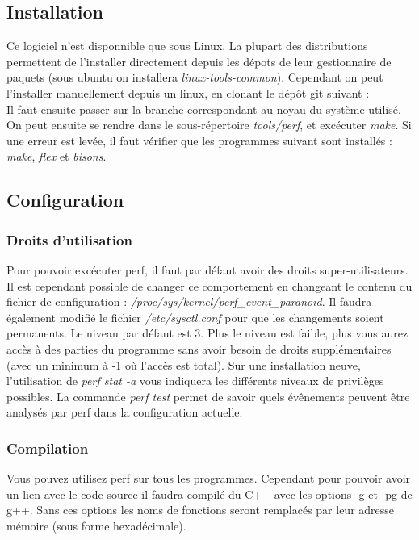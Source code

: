 \documentclass[a4paper, 12pt]{article}
\begin{document}
\subsection{Installation}
    Ce logiciel n'est disponnible que sous Linux. La plupart des distributions permettent de l'installer directement depuis les dépots de leur gestionnaire de paquets (sous ubuntu on installera \emph{linux-tools-common}). 
    Cependant on peut l'installer manuellement depuis un linux, en clonant le dépôt git suivant : \emph{}\\Il faut ensuite passer sur la branche correspondant au noyau du système utilisé.
    On peut ensuite se rendre dans le sous-répertoire \emph{tools/perf}, et excécuter \emph{make}. Si une erreur est levée, il faut vérifier que les programmes suivant sont installés : \emph{make}, \emph{flex} et \emph{bisons}.
\subsection{Configuration}
    \subsubsection{Droits d'utilisation}
        Pour pouvoir excécuter perf, il faut par défaut avoir des droits super-utilisateurs. 
        Il est cependant possible de changer ce comportement en changeant le contenu du fichier de configuration : \emph{/proc/sys/kernel/perf\_event\_paranoid}. Il faudra également modifié le fichier \emph{/etc/sysctl.conf} pour que les changements soient permanents.
        Le niveau par défaut est 3. Plus le niveau est faible, plus vous aurez accès à des parties du programme sans avoir besoin de droits supplémentaires (avec un minimum à -1 où l'accès est total).
        Sur une installation neuve, l'utilisation de \emph{perf stat -a} vous indiquera les différents niveaux de privilèges possibles.
        La commande \emph{perf test} permet de savoir quels évênements peuvent être analysés par perf dans la configuration actuelle.
    \subsubsection{Compilation}
        Vous pouvez utilisez perf sur tous les programmes. Cependant pour pouvoir avoir un lien avec le code source il faudra compilé du C++ avec les options -g et -pg de g++.
        Sans ces options les noms de fonctions seront remplacés par leur adresse mémoire (sous forme hexadécimale).
\end{document}
